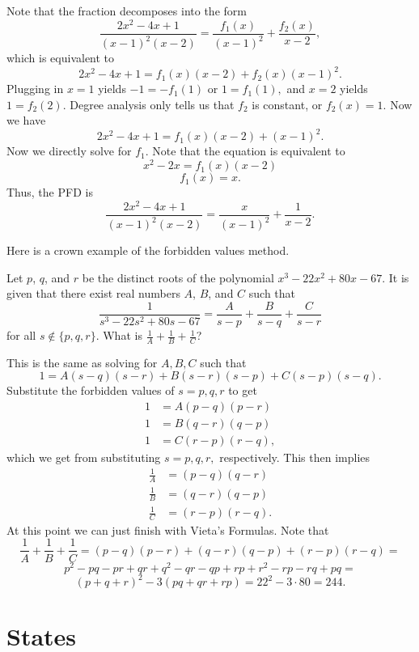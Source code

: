 \documentclass[blue,onecol]{shooting}
\begin{document}
\begin{sol}
Note that the fraction decomposes into the form
\[\frac{2x^2-4x+1}{(x-1)^2(x-2)}=\frac{f_1(x)}{(x-1)^2}+\frac{f_2(x)}{x-2},\]
which is equivalent to
\[2x^2-4x+1=f_1(x)(x-2)+f_2(x)(x-1)^2.\]
Plugging in $x=1$ yields $-1=-f_1(1)$ or $1=f_1(1),$ and $x=2$ yields $1=f_2(2).$ Degree analysis only tells us that $f_2$ is constant, or $f_2(x)=1.$ Now we have
\[2x^2-4x+1=f_1(x)(x-2)+(x-1)^2.\]
Now we directly solve for $f_1.$ Note that the equation is equivalent to
\[x^2-2x=f_1(x)(x-2)\]
\[f_1(x)=x.\]
Thus, the PFD is
\[\frac{2x^2-4x+1}{(x-1)^2(x-2)}=\frac{x}{(x-1)^2}+\frac{1}{x-2}.\]
\end{sol}

Here is a crown example of the forbidden values method.

\begin{exam}[AMC 10A 2019/24]
Let $p$, $q$, and $r$ be the distinct roots of the polynomial $x^3 - 22x^2 + 80x - 67$. It is given that there exist real numbers $A$, $B$, and $C$ such that\[\dfrac{1}{s^3 - 22s^2 + 80s - 67} = \dfrac{A}{s-p} + \dfrac{B}{s-q} + \frac{C}{s-r}\]for all $s\not\in\{p,q,r\}$. What is $\tfrac1A+\tfrac1B+\tfrac1C$?
\end{exam}

\begin{sol}
This is the same as solving for $A,B,C$ such that
\[1=A(s-q)(s-r)+B(s-r)(s-p)+C(s-p)(s-q).\]
Substitute the forbidden values of $s=p,q,r$ to get
\begin{align*}
1&=A(p-q)(p-r) \\
1&=B(q-r)(q-p) \\
1&=C(r-p)(r-q),
\end{align*}
which we get from substituting $s=p,q,r,$ respectively. This then implies
\begin{align*}
\frac{1}{A}&=(p-q)(q-r) \\
\frac{1}{B}&=(q-r)(q-p) \\
\frac{1}{C}&=(r-p)(r-q).
\end{align*}
At this point we can just finish with Vieta's Formulas. Note that
\[\frac{1}{A}+\frac{1}{B}+\frac{1}{C}=(p-q)(p-r)+(q-r)(q-p)+(r-p)(r-q)=\]
\[p^2-pq-pr+qr+q^2-qr-qp+rp+r^2-rp-rq+pq=\]
\[(p+q+r)^2-3(pq+qr+rp)=22^2-3\cdot 80=244.\]
\end{sol}


\chapter{States}
\end{document}
